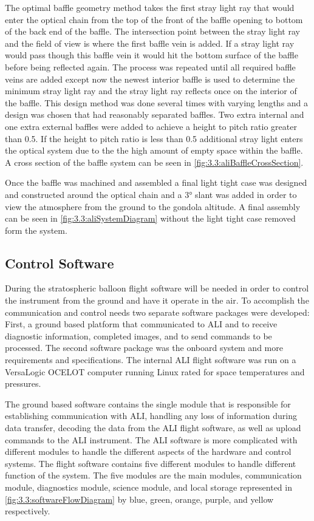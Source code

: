 The optimal baffle geometry method takes the first stray light ray that would enter the optical chain from the top of the front of the baffle opening to bottom of the back end of the baffle. The intersection point between the stray light ray and the field of view is where the first baffle vein is added. If a stray light ray would pass though this baffle vein it would hit the bottom surface of the baffle before being reflected again. The process was repeated until all required baffle veins are added except now the newest interior baffle is used to determine the minimum stray light ray and the stray light ray reflects once on the interior of the baffle. This design method was done several times with varying lengths and a design was chosen
that had reasonably separated baffles. Two extra internal and one extra external baffles were added to achieve a height to pitch ratio greater than 0.5. If the height to pitch ratio is less than 0.5 additional stray light enters the optical system due to the the high amount of empty space within the baffle. A cross section of the baffle system can be seen in \autoref{fig:3.3:aliBaffleCrossSection}.

Once the baffle was machined and assembled a final light tight case was designed and constructed around the optical chain and a 3\si{\degree} slant was added in order to view the atmosphere from the ground to the gondola altitude. A final assembly can be seen in \autoref{fig:3.3:aliSystemDiagram} without the light tight case removed form the system.

\subsection{Control Software}

During the stratospheric balloon flight software will be needed in order to control the instrument from the ground and have it operate in the air. To accomplish the communication and control needs two separate software packages were developed: First, a ground based platform that communicated to ALI and to receive diagnostic information, completed images, and to send commands to be processed. The second software package was the onboard system and more requirements and specifications. The internal ALI flight software was run on a VersaLogic OCELOT computer running Linux rated for space temperatures and pressures.

The ground based software contains the single module that is responsible for establishing communication with ALI, handling any loss of information during data transfer, decoding the data from the ALI flight software, as well as upload commands to the ALI instrument. The ALI software is more complicated with different modules to handle the different aspects of the hardware and control systems. The flight software contains five different modules to handle different function of the system. The five modules are the main modules, communication module, diagnostics module, science module, and local storage represented in \autoref{fig:3.3:softwareFlowDiagram} by blue, green, orange, purple, and yellow respectively.

